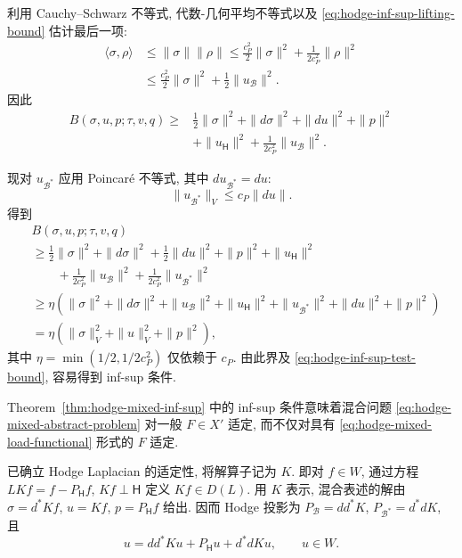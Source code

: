 \begin{Proof}
{利用 Cauchy–Schwarz 不等式, 代数-几何平均不等式以及 \eqref{eq:hodge-inf-sup-lifting-bound} 估计最后一项:}
\[
\begin{aligned}
\langle\sigma,\rho\rangle&\leq\|\sigma\|\|\rho\|\leq\frac{c_P^2}{2}\|\sigma\|^2+\frac{1}{2c_P^2}\|\rho\|^2\\
&\leq\frac{c_P^2}{2}\|\sigma\|^2+\frac12\|u_{\mathcal B}\|^2.
\end{aligned}
\]
{因此}
\[
\begin{aligned}
B(\sigma,u,p;\tau,v,q)\geq{}&\frac12\|\sigma\|^2+\|d\sigma\|^2+\|du\|^2+\|p\|^2\\
&+\|u_{\mathsf H}\|^2+\frac{1}{2c_P^2}\|u_{\mathcal B}\|^2.
\end{aligned}
\]

{现对 $u_{\mathcal B^*}$ 应用 Poincaré 不等式, 其中 $du_{\mathcal B^*}=du$:}
\[
\|u_{\mathcal B^*}\|_V\leq c_P\|du\|.
\]
{得到}
\[
\begin{aligned}
&B(\sigma,u,p;\tau,v,q)\\
&\geq\frac12\|\sigma\|^2+\|d\sigma\|^2+\frac12\|du\|^2+\|p\|^2+\|u_{\mathsf H}\|^2\\
&\qquad+\frac{1}{2c_P^2}\|u_{\mathcal B}\|^2+\frac{1}{2c_P^2}\|u_{\mathcal B^*}\|^2\\
&\geq\eta(\|\sigma\|^2+\|d\sigma\|^2+\|u_{\mathcal B}\|^2+\|u_{\mathsf H}\|^2+\|u_{\mathcal B^*}\|^2+\|du\|^2+\|p\|^2)\\
&=\eta(\|\sigma\|_V^2+\|u\|_V^2+\|p\|^2),
\end{aligned}
\]
{其中 $\eta=\min(1/2,1/2c_P^2)$ 仅依赖于 $c_P$. 由此界及 \eqref{eq:hodge-inf-sup-test-bound}, 容易得到 inf-sup 条件.}
\end{Proof}

\begin{Remark}\label{rem:hodge-general-mixed-load}
{Theorem~\ref{thm:hodge-mixed-inf-sup} 中的 inf-sup 条件意味着混合问题 \eqref{eq:hodge-mixed-abstract-problem} 对一般 $F\in X'$ 适定, 而不仅对具有 \eqref{eq:hodge-mixed-load-functional} 形式的 $F$ 适定.}
\end{Remark}

{已确立 Hodge Laplacian 的适定性, 将解算子记为 $K$. 即对 $f\in W$, 通过方程 $LKf=f-P_{\mathsf H}f$, $Kf\perp\mathsf H$ 定义 $Kf\in D(L)$. 用 $K$ 表示, 混合表述的解由 $\sigma=d^*Kf$, $u=Kf$, $p=P_{\mathsf H}f$ 给出. 因而 Hodge 投影为 $P_{\mathcal B}=dd^*K$, $P_{\mathcal B^*}=d^*dK$, 且}
\[
u=dd^*Ku+P_{\mathsf H}u+d^*dKu,\qquad u\in W.
\]

